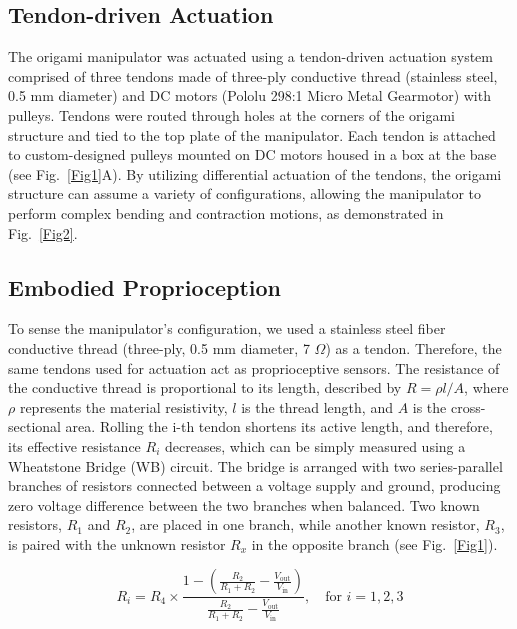 \documentclass[journal, letterpaper]{IEEEtran}
\begin{document}
\subsection{Tendon-driven Actuation}
The origami manipulator was actuated using a tendon-driven actuation system comprised of three tendons made of three-ply conductive thread (stainless steel, 0.5 mm diameter) and DC motors (Pololu 298:1 Micro Metal Gearmotor) with pulleys. Tendons were routed through holes at the corners of the origami structure and tied to the top plate of the manipulator. Each tendon is attached to custom-designed pulleys mounted on DC motors housed in a box at the base (see Fig.~\ref{Fig1}A).
By utilizing differential actuation of the tendons, the origami structure can assume a variety of configurations, allowing the manipulator to perform complex bending and contraction motions, as demonstrated in Fig.~\ref{Fig2}.

\subsection{Embodied Proprioception}
To sense the manipulator's configuration, we used a stainless steel fiber conductive thread (three-ply, 0.5 mm diameter, 7 $\Omega$) as a tendon.
Therefore, the same tendons used for actuation act as proprioceptive sensors. 
The resistance of the conductive thread is proportional to its length, described by $R = {\rho l}/{A}$, where $\rho$ represents the material resistivity, $l$ is the thread length, and $A$ is the cross-sectional area. Rolling the i-th tendon shortens its active length, and therefore, its effective resistance $R_i$ decreases, which can be simply measured using a Wheatstone Bridge (WB) circuit. 
The bridge is arranged with two series-parallel branches of resistors connected between a voltage supply and ground, producing zero voltage difference between the two branches when balanced. Two known resistors, \( R_1 \) and \( R_2 \), are placed in one branch, while another known resistor, \( R_3 \), is paired with the unknown resistor \( R_x \) in the opposite branch (see Fig.~\ref{Fig1}). 



\begin{equation}
    R_i = R_4 \times \frac{1 - \left( \frac{R_2}{R_1 + R_2} - \frac{V_{\text{out}}}{V_{\text{in}}} \right)}{\frac{R_2}{R_1 + R_2} - \frac{V_{\text{out}}}{V_{\text{in}}}}, \quad \text{for } i = 1, 2, 3
\end{equation}
\end{document}

